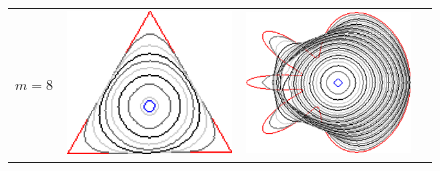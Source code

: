 \begin{figure}
\begin{tabular}{p{3em}ccc}
$m=8$ & \includegraphics[scale=0.25]{figures/chapter6/level-effect/triangle/improve/len_pen0/radius-9/level8/summary.pdf} &
\includegraphics[scale=0.25]{figures/chapter6/level-effect/flower/improve/len_pen0/radius-9/level8/summary.pdf} &

\end{tabular}
\end{figure}
